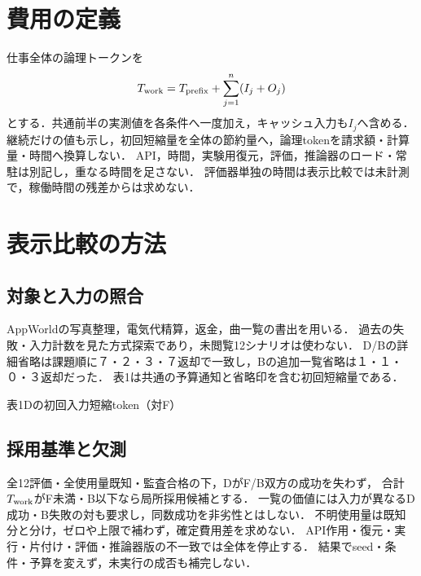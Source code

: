 \documentclass[letter]{ieicej}
\begin{document}
\section{費用の定義}
仕事全体の論理トークンを
\begin{equation}
 T_{\rm work}=T_{\rm prefix}+\sum_{j=1}^{n}(I_j+O_j)
\end{equation}
とする．共通前半の実測値を各条件へ一度加え，キャッシュ入力も$I_j$へ含める．
継続だけの値も示し，初回短縮量を全体の節約量へ，論理tokenを請求額・計算量・時間へ換算しない．
API，時間，実験用復元，評価，推論器のロード・常駐は別記し，重なる時間を足さない．
評価器単独の時間は表示比較では未計測で，稼働時間の残差からは求めない．

\section{表示比較の方法}



\subsection{対象と入力の照合}
AppWorld\cite{appworld}の写真整理，電気代精算，返金，曲一覧の書出を用いる．
過去の失敗・入力計数を見た方式探索であり，未閲覧12シナリオは使わない．
D/Bの詳細省略は課題順に７・２・３・７返却で一致し，Bの追加一覧省略は１・１・０・３返却だった．
表1は共通の予算通知と省略印を含む初回短縮量である．

\begin{center}\begin{minipage}{\columnwidth}\centering
\small 表1\quad Dの初回入力短縮token（対F）\par\smallskip
\PublicDisplayInitialSavings
\end{minipage}\end{center}

\subsection{採用基準と欠測}
全12評価・全使用量既知・監査合格の下，DがF/B双方の成功を失わず，
合計$T_{\rm work}$がF未満・B以下なら局所採用候補とする．
一覧の価値には入力が異なるD成功・B失敗の対も要求し，同数成功を非劣性とはしない．
不明使用量は既知分と分け，ゼロや上限で補わず，確定費用差を求めない．
API作用・復元・実行・片付け・評価・推論器版の不一致では全体を停止する．
結果でseed・条件・予算を変えず，未実行の成否も補完しない．
\end{document}
